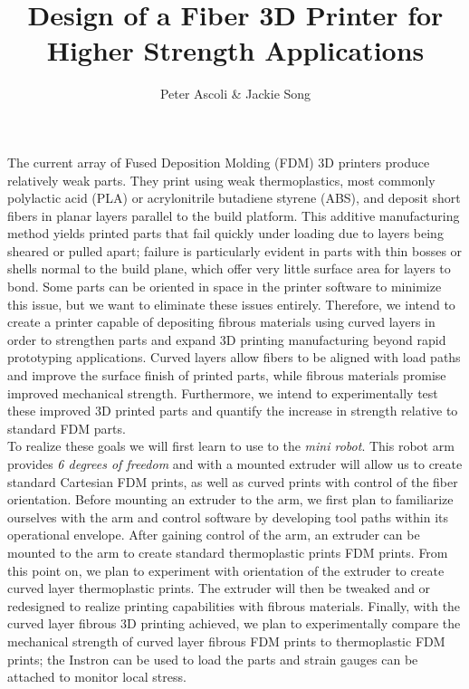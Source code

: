 \documentclass[letter,10pt]{article}
\begin{document}
\title{Design of a Fiber 3D Printer for Higher Strength Applications}
\author{Peter Ascoli \& Jackie Song}
\date{}
\maketitle


The current array of Fused Deposition Molding (FDM) 3D printers produce relatively weak parts. They print using weak thermoplastics, most commonly polylactic acid (PLA) or acrylonitrile butadiene styrene (ABS), and deposit short fibers in planar layers parallel to the build platform. This additive manufacturing method yields printed parts that fail quickly under loading due to layers being sheared or pulled apart; failure is particularly evident in parts with thin bosses or shells normal to the build plane, which offer very little surface area for layers to bond. Some parts can be oriented in space in the printer software to minimize this issue, but we want to eliminate these issues entirely. Therefore, we intend to create a printer capable of depositing fibrous materials using curved layers in order to strengthen parts and expand 3D printing manufacturing beyond rapid prototyping applications. Curved layers allow fibers to be aligned with load paths and improve the surface finish of printed parts, while fibrous materials promise improved mechanical strength. Furthermore, we intend to experimentally test these improved 3D printed parts and quantify the increase in strength relative to standard FDM parts.\\


To realize these goals we will first learn to use to the \emph{mini robot}. This robot arm provides \emph{6 degrees of freedom} and with a mounted extruder will allow us to create standard Cartesian FDM prints, as well as curved prints with control of the fiber orientation. Before mounting an extruder to the arm, we first plan to familiarize ourselves with the arm and control software by developing tool paths within its operational envelope. After gaining control of the arm, an extruder can be mounted to the arm to create standard thermoplastic prints FDM prints. From this point on, we plan to experiment with orientation of the extruder to create curved layer thermoplastic prints. The extruder will then be tweaked and or redesigned to realize printing capabilities with fibrous materials. Finally, with the curved layer fibrous 3D printing achieved, we plan to experimentally compare the mechanical strength of curved layer fibrous FDM prints to thermoplastic FDM prints; the Instron can be used to load the parts and strain gauges can be attached to monitor local stress.

\end{document}
